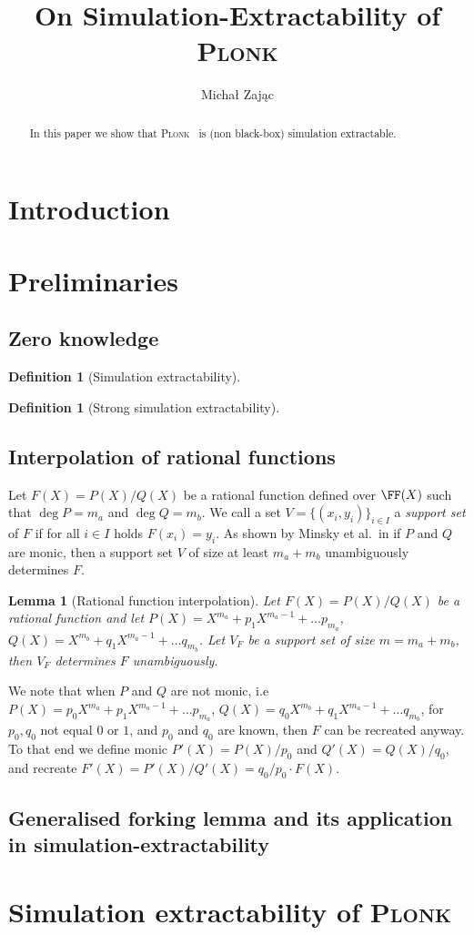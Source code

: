 \documentclass[runningheads]{amsart}
\title{On Simulation-Extractability of \textsc{Plonk}}
\author{Michał Zając}
\newtheorem{lemma}[theorem]{Lemma}
\theoremstyle{definition}
\newtheorem{definition}[theorem]{Definition}
\newcommand{\smallset}[1] {\{#1\}}
\newcommand{\plonk}{\textsc{Plonk}}
\begin{document}
	\sloppy
	\maketitle

\begin{abstract}
	In this paper we show that \plonk{}~\cite{EPRINT:GabWilCio19} is (non black-box) simulation extractable.
\end{abstract}

\section{Introduction}

\section{Preliminaries}
\subsection{Zero knowledge}
\begin{definition}[Simulation extractability]
\end{definition}
\begin{definition}[Strong simulation extractability]
\end{definition}

\subsection{Interpolation of rational functions}
Let $F(X) = P(X) / Q(X)$ be a rational function defined over $\FF(X)$ such that $\deg P = m_a$ and $\deg Q = m_b$. We call a set $V = \smallset{(x_i, y_i)}_{i \in I}$ a \emph{support set} of $F$ if for all $i \in I$ holds $F(x_i) = y_i$. 
As shown by Minsky et al.~in \cite{TIT:MinTraZip03} if $P$ and $Q$ are monic, then a support set $V$ of size at least $m_a + m_b$ unambiguously determines $F$. 

\begin{lemma}[Rational function interpolation]
  Let $F(X) = P(X) / Q(X)$ be a rational function and let $P(X) = X^{m_a} + p_1 X^{m_a - 1} + \ldots p_{m_a}$, $Q(X) = X^{m_b} + q_1 X^{m_a - 1} + \ldots q_{m_b}$. Let $V_F$ be a support set of size $m = m_a + m_b$, then $V_F$ determines $F$ unambiguously.
\end{lemma}

We note that when $P$ and $Q$ are not monic, i.e~$P(X) = p_0 X^{m_a} + p_1 X^{m_a - 1} + \ldots p_{m_a}$, $Q(X) = q_0 X^{m_b} + q_1 X^{m_a - 1} + \ldots q_{m_b}$, for $p_0, q_0$ not equal $0$ or $1$, and $p_0$ and $q_0$ are known, then $F$ can be recreated anyway. 
To that end we define monic $P'(X) = P(X) / p_0$ and $Q'(X) =  Q(X) / q_0$, and recreate $F'(X) = P'(X) / Q'(X) = q_0 /p_0 \cdot F(X)$.


\subsection{Generalised forking lemma and its application in simulation-extractability}
\section{Simulation extractability of \plonk}



\end{document}

